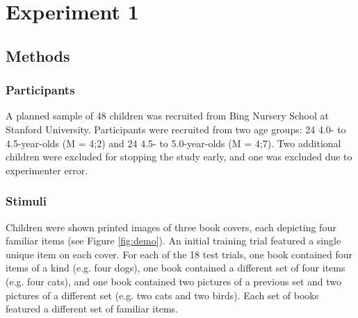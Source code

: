 \documentclass[10pt,letterpaper]{article}
\begin{document}

\section{Experiment 1} 

\subsection{Methods}

\subsubsection{Participants}

A planned sample of 48 children was recruited from Bing Nursery School at Stanford University.  Participants were recruited from two age groups: 24 4.0- to 4.5-year-olds (M = 4;2) and 24 4.5- to 5.0-year-olds (M = 4;7). Two additional children were excluded for stopping the study early, and one was excluded due to experimenter error. 

\subsubsection{Stimuli}

Children were shown printed images of three book covers, each depicting four familiar items (see Figure \ref{fig:demo}). An initial training trial featured a single unique item on each cover. For each of the 18 test trials, one book contained four items of a kind (e.g. four dogs), one book contained a different set of four items (e.g. four cats), and one book contained two pictures of a previous set and two pictures of a different set (e.g. two cats and two birds). Each set of books featured a different set of familiar items. 
\end{document}
